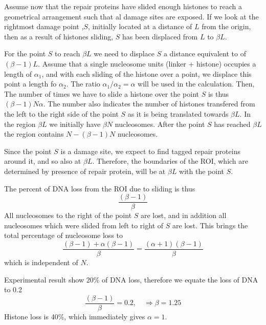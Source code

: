 \documentclass[12pt]{paper}
\begin{document}
     Assume now that the repair proteins have slided enough histones to reach a geometrical arrangement such that al damage sites are exposed. If we look at the rightmost damage point ,$S$, initially located at a distance of $L$ from the origin, then as a result of histones sliding, $S$ has been displaced from $L$ to $\beta L$. 
     
     For the point $S$ to reach $\beta L$ we need to displace $S$ a distance equivalent to of $(\beta-1)L$. Assume that a single nucleosome units (linker + histone) occupies a length of $\alpha_1$, and with each sliding of the histone over a point, we displace this point a length fo $\alpha_2$. The ratio $\alpha_1/\alpha_2 =\alpha$ will be used in the calculation. Then, The number of times we have to slide a histone over the point $S$ is thus $(\beta-1)N\alpha$.
     The number also indicates the number of histones transfered from the left to the right side of the point $S$ as it is being translated towards $\beta L$.
     In the region $\beta L$ we initially have $\beta N$ nucleosomes. After the point $S$ has reached $\beta L$ the region contains $N-(\beta-1)N$ nucleosomes. 
     
     Since the point $S$ is a damage site, we expect to find tagged repair proteins around it, and so also at $\beta L$. Therefore, the  boundaries of the ROI, which are determined by presence of repair protein, will be at $\beta L$ with the point $S$. 
     
     The percent of DNA loss from the ROI due to sliding is thus 
     \begin{equation}
     \frac{(\beta-1)}{\beta}
     \end{equation}
     All nucleosomes to the right of the point $S$ are lost, and in addition all nucleosomes which were slided from left to right of $S$ are lost. This brings the total percentage of nucleosome loss to 
     \begin{equation*}
     \frac{(\beta-1) +\alpha(\beta -1)}{\beta}= \frac{(\alpha+1)(\beta -1)}{\beta}
     \end{equation*}
     which is independent of $N$.
     
     Experimental result show 20\% of DNA loss, therefore we equate the loss of DNA to 0.2 
     \begin{equation*}
     \frac{(\beta -1)}{\beta}=0.2, \quad \Rightarrow \beta = 1.25
     \end{equation*}     
     Histone loss is 40\%, which immediately gives $\alpha =1$.
     
\end{document}
